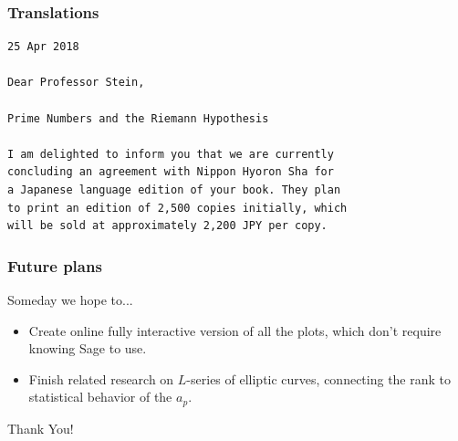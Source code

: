 \documentclass{beamer}
\begin{document}
\begin{frame}[fragile]
  \frametitle{Translations}
  \begin{verbatim}
25 Apr 2018
 
Dear Professor Stein,

Prime Numbers and the Riemann Hypothesis

I am delighted to inform you that we are currently
concluding an agreement with Nippon Hyoron Sha for
a Japanese language edition of your book. They plan
to print an edition of 2,500 copies initially, which
will be sold at approximately 2,200 JPY per copy.
  \end{verbatim}
\end{frame}


\begin{frame}
  \frametitle{Future plans}
  \begin{block}{Someday we hope to...}
    \begin{itemize}
      \item Create online fully interactive version of all the
            plots, which don't require knowing Sage to use.
      \item Finish related research on $L$-series of elliptic curves, connecting the rank to statistical
            behavior of the $a_p$.
    \end{itemize}
  \end{block}
  \vfill
  
  \begin{center}
Thank You!
\end{center}

\end{frame}
\end{document}
